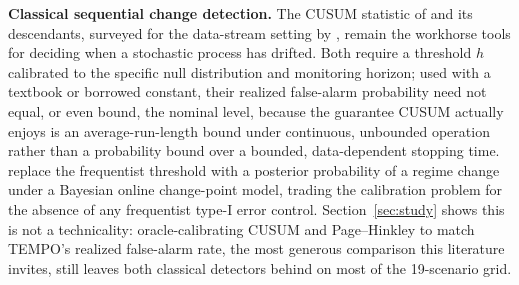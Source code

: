 \documentclass[trsc,dblanonrev]{informs4}
\begin{document}
\textbf{Classical sequential change detection.} The CUSUM statistic of
\citet{page1954} and its descendants, surveyed for the data-stream
setting by \citet{gama2014survey}, remain the workhorse tools for
deciding when a stochastic process has drifted. Both require a
threshold $h$ calibrated to the specific null distribution and
monitoring horizon; used with a textbook or borrowed constant, their
realized false-alarm probability need not equal, or even bound, the
nominal level, because the guarantee CUSUM actually enjoys is an
average-run-length bound under continuous, unbounded operation rather
than a probability bound over a bounded, data-dependent stopping time.
\citet{adams2007bayesian} replace the frequentist threshold with a
posterior probability of a regime change under a Bayesian online
change-point model, trading the calibration problem for the absence of
any frequentist type-I error control. Section~\ref{sec:study} shows
this is not a technicality: oracle-calibrating CUSUM and
Page--Hinkley to match TEMPO's realized false-alarm rate, the most
generous comparison this literature invites, still leaves both
classical detectors behind on most of the 19-scenario grid.
\end{document}
